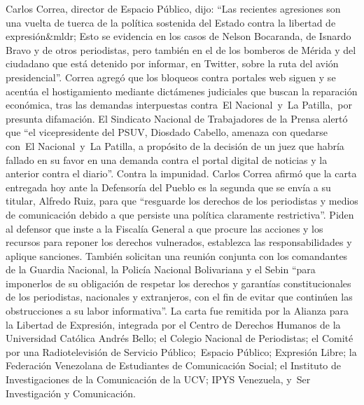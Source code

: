 \documentclass{article}%
\begin{document}
\newline%
%
Carlos Correa, director de Espacio Público, dijo: “Las recientes agresiones son una vuelta de tuerca de la política sostenida del Estado contra la libertad de expresión\&mldr; Esto se evidencia en los casos de Nelson Bocaranda, de Isnardo Bravo y de otros periodistas, pero también en el de los bomberos de Mérida y del ciudadano que está detenido por informar, en Twitter, sobre la ruta del avión presidencial”.%
\newline%
%
Correa agregó que los bloqueos contra portales web siguen y se acentúa el hostigamiento mediante dictámenes judiciales que buscan la reparación económica, tras las demandas interpuestas contra~El Nacional~y~La Patilla,~por presunta difamación.%
\newline%
%
El Sindicato Nacional de Trabajadores de la Prensa alertó que “el vicepresidente del PSUV, Diosdado Cabello, amenaza con quedarse con~El Nacional~y~La Patilla, a propósito de la decisión de un juez que habría fallado en su favor en una demanda contra el portal digital de noticias y la anterior contra el diario”.%
\newline%
%
Contra la impunidad. Carlos Correa afirmó que la carta entregada hoy ante la Defensoría del Pueblo es la segunda que se envía a su titular, Alfredo Ruiz, para que “resguarde los derechos de los periodistas y medios de comunicación debido a que persiste una política claramente restrictiva”.%
\newline%
%
Piden al defensor que inste a la Fiscalía General a que procure las acciones y los recursos para reponer los derechos vulnerados, establezca las responsabilidades y aplique sanciones. También solicitan una reunión conjunta con los comandantes de la Guardia Nacional, la Policía Nacional Bolivariana y el Sebin “para imponerlos de su obligación de respetar los derechos y garantías constitucionales de los periodistas, nacionales y extranjeros, con el fin de evitar que continúen las obstrucciones a su labor informativa”.%
\newline%
%
La carta fue remitida por la Alianza para la Libertad de Expresión, integrada por el Centro de Derechos Humanos de la Universidad Católica Andrés Bello; el Colegio Nacional de Periodistas; el Comité por una Radiotelevisión de Servicio Público;~Espacio Público; Expresión Libre; la Federación Venezolana de Estudiantes de Comunicación Social; el Instituto de Investigaciones de la Comunicación de la UCV; IPYS Venezuela, y~Ser Investigación y Comunicación.%
\newline%
%
\end{document}
